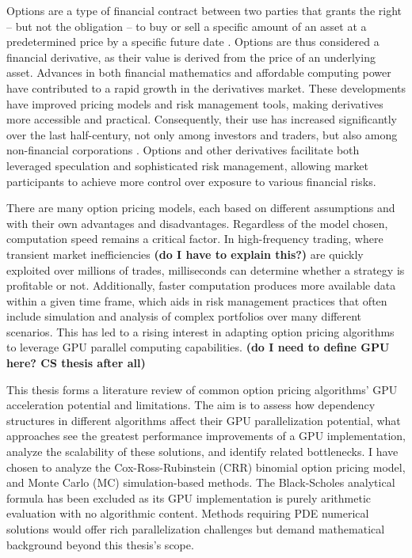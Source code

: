 \documentclass[english,12pt,a4paper,pdftex,sci,utf8]{aaltothesis}
\begin{document}
\thispagestyle{empty}
Options are a type of financial contract between two parties that grants the right -- but not the obligation -- to buy or sell a specific amount of an asset at a predetermined price by a specific future date \cite{hull2016options}. Options are thus considered a financial derivative, as their value is derived from the price of an underlying asset. Advances in both financial mathematics \cite{merton1994influence} and affordable computing power \cite{nordhaus2007two} have contributed to a rapid growth in the derivatives market. These developments have improved pricing models and risk management tools, making derivatives more accessible and practical. Consequently, their use has increased significantly over the last half-century, not only among investors and traders, but also among non-financial corporations \cite{bartram2009international}. Options and other derivatives facilitate both leveraged speculation and sophisticated risk management, allowing market participants to achieve more control over exposure to various financial risks.

There are many option pricing models, each based on different assumptions and with their own advantages and disadvantages. Regardless of the model chosen, computation speed remains a critical factor. In high-frequency trading, where transient market inefficiencies \textbf{(do I have to explain this?)} are quickly exploited over millions of trades, milliseconds can determine whether a strategy is profitable or not. Additionally, faster computation produces more available data within a given time frame, which aids in risk management practices that often include simulation and analysis of complex portfolios over many different scenarios. This has led to a rising interest in adapting option pricing algorithms to leverage GPU parallel computing capabilities. \textbf{(do I need to define GPU here? CS thesis after all)}

This thesis forms a literature review of common option pricing algorithms' GPU acceleration potential and limitations. The aim is to assess how dependency structures in different algorithms affect their GPU parallelization potential, what approaches see the greatest performance improvements of a GPU implementation, analyze the scalability of these solutions, and identify related bottlenecks. I have chosen to analyze the Cox-Ross-Rubinstein (CRR) binomial option pricing model, and Monte Carlo (MC) simulation-based methods. The Black-Scholes analytical formula has been excluded as its GPU implementation is purely arithmetic evaluation with no algorithmic content. Methods requiring PDE numerical solutions would offer rich parallelization challenges but demand mathematical background beyond this thesis's scope.
\end{document}
